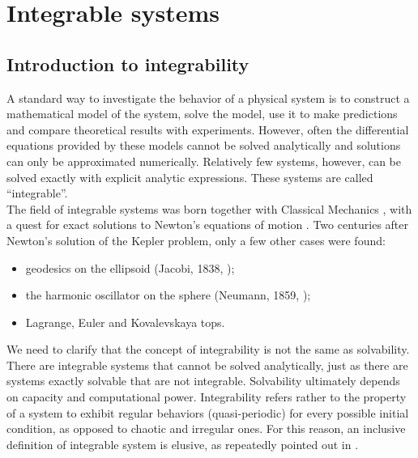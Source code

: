 \section{Integrable systems}
\subsection{Introduction to integrability}
A standard way to investigate the behavior of a physical system is to construct a mathematical model of the system, solve the model, use it to make predictions and compare theoretical results with experiments. However, often the differential equations provided by these models cannot be solved analytically and solutions can only be approximated numerically. Relatively few systems, however, can be solved exactly with explicit analytic expressions. These systems are called ``integrable''. \\
The field of integrable systems was born together with Classical Mechanics \cite{babelon2003}, with a quest for exact solutions to Newton's equations of motion \cite{newton1687}. Two centuries after Newton's solution of the Kepler problem, only a few other cases were found:

\begin{itemize}
    \item geodesics on the ellipsoid (Jacobi, 1838, \cite{jacobi1936});
    \item the harmonic oscillator on the sphere (Neumann, 1859, \cite{neumann1859});
    \item Lagrange, Euler and Kovalevskaya \cite{kowalevski1889} tops.
\end{itemize}

We need to clarify that the concept of integrability is not the same as solvability. There are integrable systems that cannot be solved analytically, just as there are systems exactly solvable that are not integrable. Solvability ultimately depends on capacity and computational power. Integrability refers rather to the property of a system to exhibit regular behaviors (quasi-periodic) for every possible initial condition, as opposed to chaotic and irregular ones. For this reason, an inclusive definition of integrable system is elusive, as repeatedly pointed out in \cite{zakharov2012integrability}.

